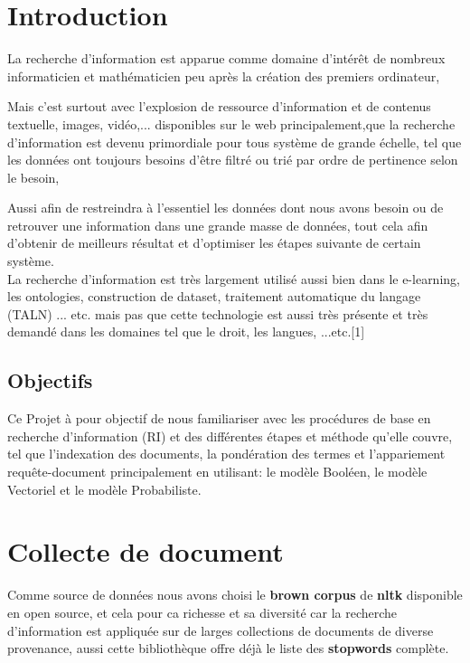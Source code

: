 \documentclass[12pt,a4paper,oneside]{article}
\begin{document}
	
		\def\reportnumber{}
		\def\reporttitle{Recherche d'information}
		
		
		
		\sffamily
		
		\setcounter{tocdepth}{3}
		\tableofcontents
		\listoffigures
		\newpage

\section*{Introduction}

La recherche d'information est apparue comme domaine d'intérêt de nombreux informaticien et mathématicien peu après la création des premiers ordinateur,

Mais c'est surtout avec l'explosion de ressource d'information et de contenus textuelle, images, vidéo,...  disponibles sur le web principalement,que la recherche d'information est devenu primordiale pour tous système de grande échelle, tel que les données ont toujours besoins d'être filtré ou trié par ordre de pertinence selon le besoin,

Aussi afin de restreindra à l'essentiel les données dont nous avons besoin ou de retrouver une information dans une grande masse de données, tout cela afin d'obtenir de meilleurs résultat et d'optimiser les étapes suivante de certain système.\\

La recherche d'information est très largement utilisé aussi bien dans le e-learning, les ontologies, construction de dataset, traitement automatique du langage (TALN) ... etc. mais pas que cette technologie est aussi très présente et très demandé dans les domaines tel que le droit, les langues, ...etc.[1]


\subsection*{Objectifs}
Ce Projet à pour objectif de nous familiariser avec les procédures de base en recherche d'information (RI) et des différentes étapes et méthode qu'elle couvre, tel que l'indexation des documents, la pondération des termes et l'appariement requête-document principalement en utilisant: le modèle Booléen, le modèle Vectoriel et le modèle Probabiliste.

\newpage

\section{Collecte de document}
Comme source de données nous avons choisi le \textbf{brown corpus} de \textbf{nltk} disponible en open source, et cela pour ca richesse et sa diversité car la recherche d'information est appliquée sur de larges collections de documents de diverse provenance, aussi cette bibliothèque offre déjà le liste des \textbf{stopwords} complète. 
\end{document}
